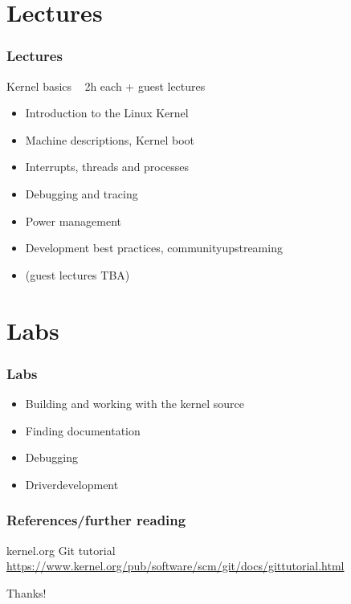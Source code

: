 \documentclass{beamer}
\begin{document}
\section{Lectures}
\begin{frame}
\frametitle{Lectures}
Kernel basics ~ 2h each + guest lectures
\begin{itemize}
	\item Introduction to the Linux Kernel	
	\item Machine descriptions, Kernel boot
	\item Interrupts, threads and processes
	\item Debugging and tracing 
	\item Power management
	\item Development best practices, communityupstreaming
	\item (guest lectures TBA)
\end{itemize}
\end{frame}

\section{Labs}
\begin{frame}
\frametitle{Labs}
\begin{itemize}
	\item Building and working with the kernel source
	\item Finding documentation
	\item Debugging
	\item Driverdevelopment 
\end{itemize} 
\end{frame}


\begin{frame}
\frametitle{References/further reading}
\footnotesize{
\begin{thebibliography}{99} %
 kernel.org
\newblock Git tutorial
\newblock \url{https://www.kernel.org/pub/software/scm/git/docs/gittutorial.html}
\end{thebibliography}
}
\end{frame}

\begin{frame}
\Huge{\centerline{Thanks!}}
\end{frame}
\end{document}
